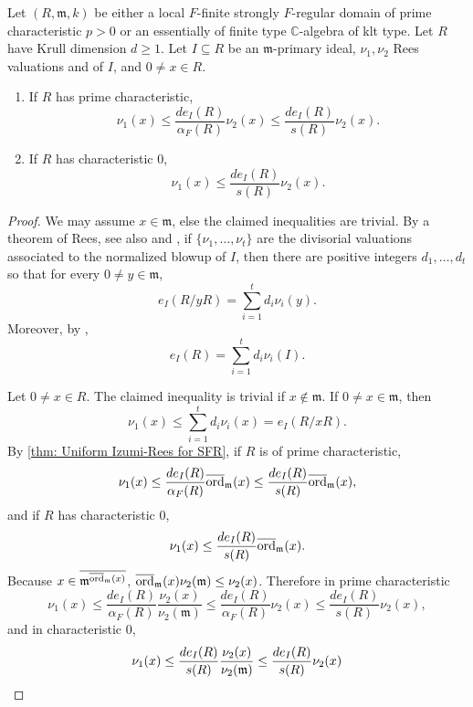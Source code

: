 \documentclass[12pt]{amsart}
\numberwithin{equation}{theorem}
\theoremstyle{plain}
\newcommand{\fm}{\mathfrak{m}}
\newcommand{\CC}{\mathbb{C}}
\begin{document}
\begin{corollary}
    \label{cor: explicit Izumi-Rees bound}
     Let $(R,\fm,k)$ be either a local $F$-finite strongly $F$-regular domain of prime characteristic $p>0$ or an essentially of finite type $\CC$-algebra of klt type. Let $R$ have Krull dimension $d\geq 1$. Let $I\subseteq R$ be an $\fm$-primary ideal, $\nu_1,\nu_2$ Rees valuations and of $I$, and $0\not=x\in R$.
     
     \begin{enumerate}
         \item If $R$ has prime characteristic,
         \[
         \nu_1(x)\leq \frac{de_I(R)}{\alpha_F(R)} \nu_2(x) \leq \frac{de_I(R)}{s(R)}\nu_2(x).
         \]
         \item If $R$ has characteristic $0$,
         \[
         \nu_1(x)\leq \frac{de_I(R)}{s(R)}\nu_2(x).
         \]
     \end{enumerate}
\end{corollary}

\begin{proof}
    We may assume $x\in \fm$, else the claimed inequalities are trivial. By a theorem of Rees, \cite[Main Result]{Rees1961} see also \cite[Theorem~2.8]{Polstra2026} and \cite[Corollary 4.13]{CutkoskyMontano2025}, if $\{\nu_1,\ldots,\nu_t\}$ are the divisorial valuations associated to the normalized blowup of $I$, then there are positive integers $d_1,\ldots,d_t$ so that for every $0\not=y\in\fm$,
    \[
    e_I(R/yR) = \sum_{i=1}^td_i\nu_i(y).
    \]
    Moreover, by \cite[Corollary~2.9]{Polstra2026},
    \[
    e_I(R) = \sum_{i=1}^t d_i\nu_i(I).
    \]

    Let $0\not=x\in R$. The claimed inequality is trivial if $x\not\in\fm$. If $0\not=x\in\fm$, then
    \[
    \nu_1(x)\leq \sum_{i=1}^td_i\nu_i(x) = e_I(R/xR).
    \]
    By \cref{thm: Uniform Izumi-Rees for SFR}, if $R$ is of prime characteristic,
    \[
    \nu_1(x)\leq \frac{de_I(R)}{\alpha_F(R)}\overline{\ord}_{\fm}(x) \leq \frac{de_I(R)}{s(R)}\overline{\ord}_{\fm}(x),
    \]
    and if $R$ has characteristic $0$,
    \[
    \nu_1(x)\leq \frac{de_I(R)}{s(R)}\overline{\ord}_{\fm}(x).
    \]
    Because $x\in\overline{\fm^{\overline{\ord}_{\fm}(x)}}$, $\overline{\ord}_{\fm}(x)\nu_2(\fm)\leq \nu_2(x)$. Therefore in prime characteristic
    \[
    \nu_1(x)\leq \frac{de_I(R)}{\alpha_F(R)}\frac{\nu_2(x)}{\nu_2(\fm)}\leq \frac{de_I(R)}{\alpha_F(R)}\nu_2(x)\leq \frac{de_I(R)}{s(R)}\nu_2(x),
    \]
    and in characteristic $0$,
    \[
    \nu_1(x)\leq \frac{de_I(R)}{s(R)}\frac{\nu_2(x)}{\nu_2(\fm)}\leq \frac{de_I(R)}{s(R)}\nu_2(x)\qedhere
    \]
\end{proof}
\end{document}

